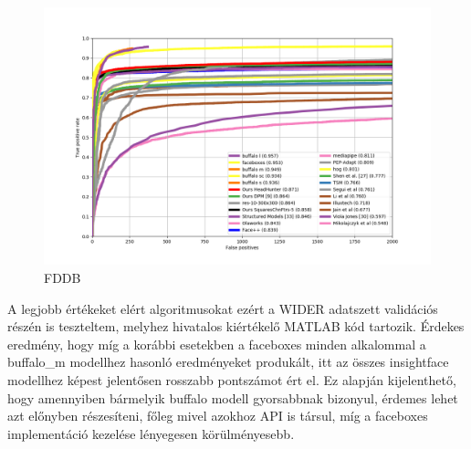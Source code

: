 \begin{figure}
    \centering
    \includegraphics[width=\linewidth]{figures/fddb.png}
    \caption{FDDB}
    \label{fig:fddb_evaluation}
\end{figure}


A legjobb értékeket elért algoritmusokat ezért a WIDER adatszett validációs részén is teszteltem, melyhez hivatalos kiértékelő MATLAB kód tartozik. Érdekes eredmény, hogy míg a korábbi esetekben a faceboxes minden alkalommal a buffalo\_m modellhez hasonló eredményeket produkált, itt az összes insightface modellhez képest jelentősen rosszabb pontszámot ért el. Ez alapján kijelenthető, hogy amennyiben bármelyik buffalo modell gyorsabbnak bizonyul, érdemes lehet azt előnyben részesíteni, főleg mivel azokhoz API is társul, míg a faceboxes implementáció kezelése lényegesen körülményesebb.


